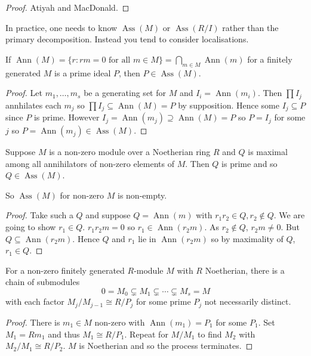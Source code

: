 \documentclass[a4paper]{article}
\DeclareMathOperator{\Ann}{Ann} %
\DeclareMathOperator{\Ass}{Ass} %
\begin{document}
\begin{proof}
  Atiyah and MacDonald.
\end{proof}

In practice, one needs to know \(\Ass(M)\) or \(\Ass(R/I)\) rather than the primary decomposition. Instead you tend to consider localisations.

\begin{lemma}
  If \(\Ann(M) = \{r: rm = 0 \text{ for all } m \in M\} = \bigcap_{m \in M} \Ann(m)\) for a finitely generated \(M\) is a prime ideal \(P\), then \(P \in \Ass(M)\).
\end{lemma}

\begin{proof}
  Let \(m_1, \dots, m_s\) be a generating set for \(M\) and \(I_i = \Ann(m_i)\). Then \(\prod I_j\) annhilates each \(m_j\) so \(\prod I_j \subseteq \Ann(M) = P\) by supposition. Hence some \(I_j \subseteq P\) since \(P\) is prime. However \(I_j = \Ann(m_j) \supseteq \Ann(M) = P\) so \(P = I_j\) for some \(j\) so \(P = \Ann(m_j) \in \Ass(M)\).
\end{proof}

\begin{lemma}
  Suppose \(M\) is a non-zero module over a Noetherian ring \(R\) and \(Q\) is maximal among all annihilators of non-zero elements of \(M\). Then \(Q\) is prime and so \(Q \in \Ass(M)\).
\end{lemma}
So \(\Ass(M)\) for non-zero \(M\) is non-empty.

\begin{proof}
  Take such a \(Q\) and suppose \(Q = \Ann(m)\) with \(r_1r_2 \in Q, r_2 \notin Q\). We are going to show \(r_1 \in Q\). \(r_1r_2m = 0\) so \(r_1 \in \Ann(r_2m)\). As \(r_2 \notin Q\), \(r_2m \neq 0\). But \(Q \subseteq \Ann(r_2m)\). Hence \(Q\) and \(r_1\) lie in \(\Ann(r_2m)\) so by maximality of \(Q\), \(r_1 \in Q\).
\end{proof}

\begin{lemma}
  \label{lem:chain of submodules related to associated primes}
  For a non-zero finitely generated \(R\)-module \(M\) with \(R\) Noetherian, there is a chain of submodules
  \[
    0 = M_0 \subsetneq M_1 \subsetneq \cdots \subsetneq M_s = M
  \]
  with each factor \(M_j/M_{j - 1} \cong R/P_j\) for some prime \(P_j\) not necessarily distinct.
\end{lemma}

\begin{proof}
  There is \(m_1 \in M\) non-zero with \(\Ann(m_1) = P_1\) for some \(P_1\). Set \(M_1 = Rm_1\) and thus \(M_1 \cong R/P_1\). Repeat for \(M/M_1\) to find \(M_2\) with \(M_2/M_1 \cong R/P_2\). \(M\) is Noetherian and so the process terminates.
\end{proof}
\end{document}
